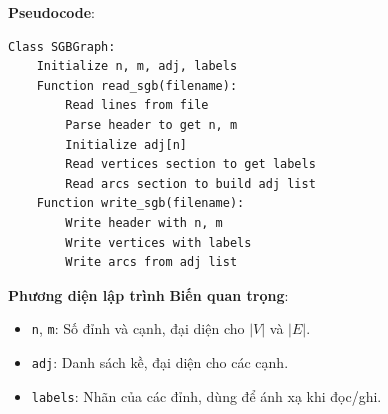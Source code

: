 \documentclass[a4paper,12pt]{article}
\begin{document}
\textbf{Pseudocode}:
\begin{verbatim}
Class SGBGraph:
    Initialize n, m, adj, labels
    Function read_sgb(filename):
        Read lines from file
        Parse header to get n, m
        Initialize adj[n]
        Read vertices section to get labels
        Read arcs section to build adj list
    Function write_sgb(filename):
        Write header with n, m
        Write vertices with labels
        Write arcs from adj list
\end{verbatim}

\textbf{Phương diện lập trình}
\textbf{Biến quan trọng}:
\begin{itemize}
    \item \texttt{n}, \texttt{m}: Số đỉnh và cạnh, đại diện cho \( |V| \) và \( |E| \).
    \item \texttt{adj}: Danh sách kề, đại diện cho các cạnh.
    \item \texttt{labels}: Nhãn của các đỉnh, dùng để ánh xạ khi đọc/ghi.
\end{itemize}
\end{document}
